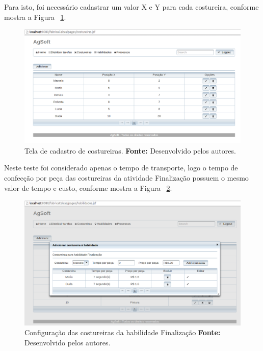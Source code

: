 \par Para isto, foi necessário cadastrar um valor X e Y para cada costureira, 
conforme mostra a Figura ~\ref{fig:add_xy_costureira_teste4}.




\begin{figure}[h!]
	\centerline{\includegraphics[scale=0.3]{./imagens/posicao_xy_costureiras_teste4.png}}
	\caption[Tela de cadastro de costureiras.]
	{Tela de cadastro de costureiras. \textbf{Fonte:} Desenvolvido pelos autores.}
	\label{fig:add_xy_costureira_teste4}
\end{figure}



\par Neste teste foi considerado apenas o tempo de transporte, logo o tempo de
confecção por peça das costureiras da atividade Finalização possuem o mesmo
valor de tempo e custo, conforme mostra a Figura
~\ref{fig:at_finalizacao_teste4}.


\begin{figure}[h!]
	\centerline{\includegraphics[scale=0.3]{./imagens/cofig_at_finalizaca_teste4.png}}
	\caption[Configuração das costureiras da habilidade Finalização.]
	{Configuração das costureiras da habilidade Finalização \textbf{Fonte:}
	Desenvolvido pelos autores.}
	\label{fig:at_finalizacao_teste4}
\end{figure}



